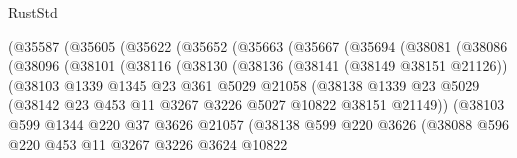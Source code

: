 \begin{lexlean}{RustStd}
\begin{coremodule}
{\begin{coremodule}
{{{{{{{{{{{{{{{{{{{{{{{{{            (@35587
              (@35605
                (@35622
                  (@35652
                    (@35663
                      (@35667
                        (@35694
                          (@38081
                            (@38086
                              (@38096
                                (@38101
                                  (@38116
                                    (@38130
                                      (@38136
                                        (@38141 (@38149 @38151 @21126))
                                        (@38103
                                          @1339
                                          @1345
                                          @23
                                          @361
                                          @5029
                                          @21058
                                          (@38138
                                            @1339
                                            @23
                                            @5029
                                            (@38142
                                              @23
                                              @453
                                              @11
                                              @3267
                                              @3226
                                              @5027
                                              @10822
                                              @38151
                                              @21149))
                                          (@38103
                                            @599
                                            @1344
                                            @220
                                            @37
                                            @3626
                                            @21057
                                            (@38138
                                              @599
                                              @220
                                              @3626
                                              (@38088
                                                @596
                                                @220
                                                @453
                                                @11
                                                @3267
                                                @3226
                                                @3624
                                                @10822
}}}}}}}}}}}}}}}}}}}}}}}}}
\end{coremodule}}
\end{coremodule}
\end{lexlean}

